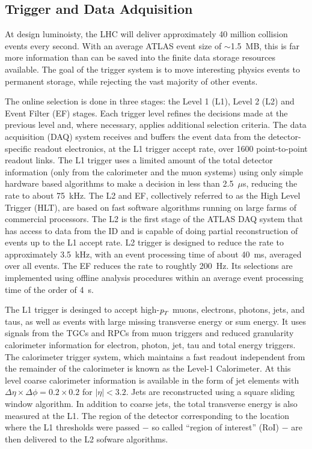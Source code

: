 \subsection{Trigger and Data Adquisition}\label{sec:TDAQ}



At design luminoisty, the LHC will deliver approximately 40 million collision events every second. With an average ATLAS event size of $\sim$1.5~MB, this is far more information than can be saved into the finite data storage resources available. The goal of the trigger system is to move interesting physics events to permanent storage, while rejecting the vast majority of other events.

The online selection is done in three stages: the Level 1 (L1), Level 2 (L2) and Event Filter (EF) stages.  Each trigger level refines the decisions made at the previous level and, where necessary, applies additional selection criteria. The data acquisition (DAQ) system  receives and buffers the event data from the detector-specific readout electronics, at the L1 trigger accept rate, over 1600 point-to-point readout links. The L1 trigger uses a limited amount of the total detector information (only from the calorimeter and the muon systems) using only simple hardware based algorithms to make a decision in less than 2.5~$\mu$s, reducing the rate to about 75~kHz. The L2 and EF, collectively referred to as the High Level Trigger (HLT), are based on fast software algorithms running on large farms of commercial processors.  The L2 is the first stage of the ATLAS DAQ system that has access to data from the ID and is capable of doing partial reconstruction of events up to the L1 accept rate. L2 trigger is designed to reduce the rate to approximately 3.5~kHz, with an event processing time of about 40~ms, averaged over all events. The EF reduces the rate to roughtly 200~Hz. Its selections are implemented  using offline analysis procedures within an average event processing time of the order of 4~s.

The L1 trigger is desinged to accept high-${\emph{p}_{T}}$ muons, electrons, photons, jets, and taus, as well as events with large missing transverse energy or sum energy. It uses signals from the TGCs and RPCs from muon triggers and reduced granularity calorimeter information for electron, photon, jet, tau and total energy triggers. The calorimeter trigger system, which maintains a fast readout independent from the remainder of the calorimeter is known as the Level-1 Calorimeter. %
At this level coarse calorimeter information is available in the form of jet elements with $\Delta \eta \times \Delta \phi = 0.2 \times 0.2$ for $|\eta|<3.2$. Jets are reconstructed using a square sliding window algorithm. In addition to coarse jets, the total transverse energy is also measured at the L1. 
The region of the detector corresponding to the location where the L1 thresholds were passed $-$ so called ``region of interest'' (RoI) $-$ are then delivered to the L2 sofware algorithms.

